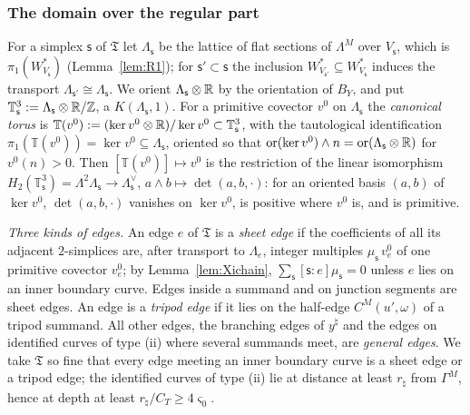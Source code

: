 \subsubsection*{The domain over the regular part}
For a simplex $\mathsf s$ of $\mathfrak T$ let $\Lambda_{\mathsf s}$ be the lattice of flat sections of $\Lambda^M$ over $V_{\mathsf s}$, which is
$\pi_1(W^*_{V_{\mathsf s}})$ (Lemma~\ref{lem:R1}); for $\mathsf s'\subset \mathsf s$ the inclusion $W^*_{V_{\mathsf s'}}\subseteq W^*_{V_{\mathsf s}}$ induces the
transport $\Lambda_{\mathsf s'}\cong\Lambda_{\mathsf s}$. We orient $\Lambda_{\mathsf s}\otimes\mathbb R$ by the orientation of $B_Y$, and put
$\mathbb T^3_{\mathsf s}:=\Lambda_{\mathsf s}\otimes\mathbb R/\mathbb Z$, a $K(\Lambda_{\mathsf s},1)$. For a primitive covector $v^0$ on $\Lambda_{\mathsf s}$ the
\emph{canonical torus} is $\mathbb T(v^0):=(\ker v^0\otimes\mathbb R)/\ker v^0\subset\mathbb T^3_{\mathsf s}$, with the tautological
identification $\pi_1(\mathbb T(v^0))=\ker v^0\subseteq\Lambda_{\mathsf s}$, oriented so that $\operatorname{or}(\ker v^0)\wedge n=
\operatorname{or}(\Lambda_{\mathsf s}\otimes\mathbb R)$ for $v^0(n)>0$. Then $[\mathbb T(v^0)]\mapsto v^0$ is the restriction of the
linear isomorphism $H_2(\mathbb T^3_{\mathsf s})=\Lambda^2\Lambda_{\mathsf s}\to\Lambda_{\mathsf s}^\vee$, $a\wedge b\mapsto\det(a,b,\cdot)$: for an oriented
basis $(a,b)$ of $\ker v^0$, $\det(a,b,\cdot)$ vanishes on $\ker v^0$, is positive where $v^0$ is, and is primitive.

\emph{Three kinds of edges.} An edge $e$ of $\mathfrak T$ is a \emph{sheet edge} if the coefficients of all its adjacent
$2$-simplices are, after transport to $\Lambda_e$, integer multiples $\mu_{\mathsf s}\,v^0_e$ of one primitive covector $v^0_e$; by
Lemma~\ref{lem:Xichain}, $\sum_{\mathsf s}[\mathsf s:e]\mu_{\mathsf s}=0$ unless $e$ lies on an inner boundary curve. Edges inside a summand and on junction
segments are sheet edges. An edge is a \emph{tripod edge} if it lies on the half-edge $C^M(u',\omega)$ of a tripod
summand. All other edges, the branching edges of $y^\natural$ and the edges on identified curves of type (ii) where
several summands meet, are \emph{general edges}. We take $\mathfrak T$ so fine that every edge meeting an inner boundary curve is a
sheet edge or a tripod edge; the identified curves of type (ii) lie at distance at least $r_\natural$ from $\Gamma^M$, hence at depth at least
$r_\natural/C_T\ge4\varsigma_0$.

